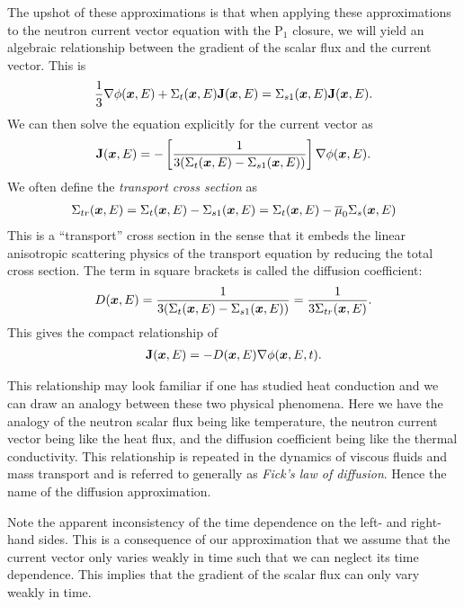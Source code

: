The upshot of these approximations is that when applying these approximations to the neutron current vector equation with the P$_1$ closure, we will yield an algebraic relationship between the gradient of the scalar flux and the current vector. This is
\begin{align}
  \frac{1}{3} \nabla \phi(\bm{x},E) + \Sigma_t(\bm{x},E) \mathbf{J}(\bm{x},E) = \Sigma_{s1}(\bm{x},E) \mathbf{J}(\bm{x},E) .
\end{align}
We can then solve the equation explicitly for the current vector as
\begin{align}
  \mathbf{J}(\bm{x},E) = - \left[ \frac{1}{ 3 ( \Sigma_t(\bm{x},E) - \Sigma_{s1}(\bm{x},E) )} \right] \nabla \phi(\bm{x},E) .
\end{align}
We often define the \emph{transport cross section} as
\begin{align}
  \Sigma_{tr}(\bm{x},E) = \Sigma_t(\bm{x},E) - \Sigma_{s1}(\bm{x},E) =  \Sigma_t(\bm{x},E) - \overline{\mu}_0 \Sigma_{s}(\bm{x},E)
\end{align}
This is a ``transport'' cross section in the sense that it embeds the linear anisotropic scattering physics of the transport equation by reducing the total cross section. The term in square brackets is called the diffusion coefficient:
\begin{align}
  D(\bm{x},E) = \frac{1}{ 3 ( \Sigma_t(\bm{x},E) - \Sigma_{s1}(\bm{x},E) )} = \frac{1}{3 \Sigma_{tr}(\bm{x},E)}.
\end{align}
This gives the compact relationship of
\begin{align} \label{Eq:neutronics_FicksLaw}
  \mathbf{J}(\bm{x},E) = - D(\bm{x},E) \nabla \phi(\bm{x},E,t) .
\end{align}

This relationship may look familiar if one has studied heat conduction and we can draw an analogy between these two physical phenomena. Here we have the analogy of the neutron scalar flux being like temperature, the neutron current vector being like the heat flux, and the diffusion coefficient being like the thermal conductivity. This relationship is repeated in the dynamics of viscous fluids and mass transport and is referred to generally as \emph{Fick's law of diffusion}. Hence the name of the diffusion approximation.

Note the apparent inconsistency of the time dependence on the left- and right-hand sides. This is a consequence of our approximation that we assume that the current vector only varies weakly in time such that we can neglect its time dependence. This implies that the gradient of the scalar flux can only vary weakly in time.

